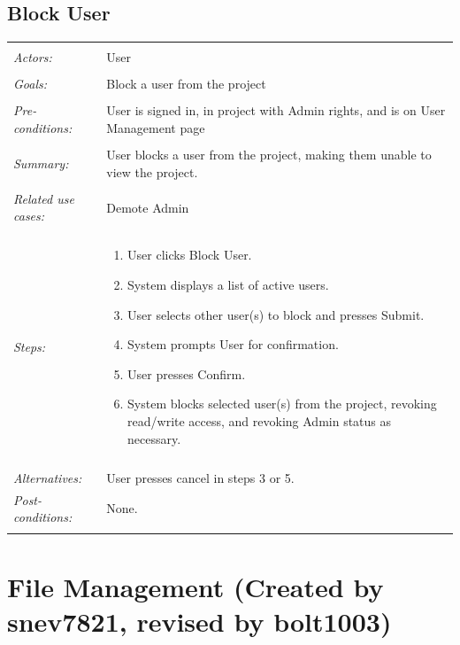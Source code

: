 \documentclass[11pt]{report}
\begin{document}
\subsection{Block User}
\begin{tabular}{ p{2cm} p{12cm} }
    \hline
    \\
    \textit{Actors:} & User \\ 
    \\
    \textit{Goals:} & Block a user from the project \\
    \\
    \textit{Pre-conditions:} & User is signed in, in project with Admin rights, and is on User Management page \\
    \\
    \textit{Summary:} & User blocks a user from the project, making them unable to view the project. \\ 
    \\
    \textit{Related use cases:} & Demote Admin \\ 
    \\
    \textit{Steps:} & \begin{enumerate}
        \item User clicks Block User.
        \item System displays a list of active users.
        \item User selects other user(s) to block and presses Submit.
        \item System prompts User for confirmation.
        \item User presses Confirm.
        \item System blocks selected user(s) from the project, revoking read/write access, and revoking Admin status as necessary.
    \end{enumerate} \\
    \\
    \textit{Alternatives:} & User presses cancel in steps 3 or 5.
    \\
    \textit{Post-conditions:} & None. \\
    \\
    \hline
\end{tabular}


\section{File Management (Created by snev7821, revised by bolt1003)}
\end{document}
